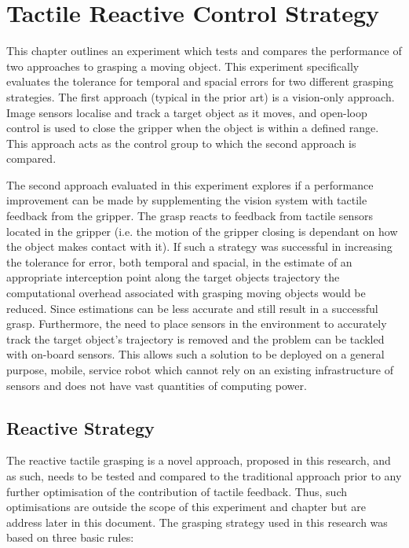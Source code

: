 \chapter{Tactile Reactive Control Strategy}\label{IROS2019}

This chapter outlines an experiment which tests and compares the performance of two approaches to grasping a moving object. This experiment specifically evaluates the tolerance for temporal and spacial errors for two different grasping strategies. The first approach (typical in the prior art) is a vision-only approach. Image sensors localise and track a target object as it moves, and open-loop control is used to close the gripper when the object is within a defined range. This approach acts as the control group to which the second approach is compared.

The second approach evaluated in this experiment explores if a performance improvement can be made by supplementing the vision system with tactile feedback from the gripper. The grasp reacts to feedback from tactile sensors located in the gripper (i.e. the motion of the gripper closing is dependant on how the object makes contact with it). If such a strategy was successful in increasing the tolerance for error, both temporal and spacial, in the estimate of an appropriate interception point along the target objects trajectory the computational overhead associated with grasping moving objects would be reduced. Since estimations can be less accurate and still result in a successful grasp. Furthermore, the need to place sensors in the environment to accurately track the target object's trajectory is removed and the problem can be tackled with on-board sensors. This allows such a solution to be deployed on a general purpose, mobile, service robot which cannot rely on an existing infrastructure of sensors and does not have vast quantities of computing power. 

\section{Reactive Strategy}\label{subsec:strategy}

The reactive tactile grasping is a novel approach, proposed in this research, and as such, needs to be tested and compared to the traditional approach prior to any further optimisation of the contribution of tactile feedback. Thus, such optimisations are outside the scope of this experiment and chapter but are address later in this document. The grasping strategy used in this research was based on three basic rules:

